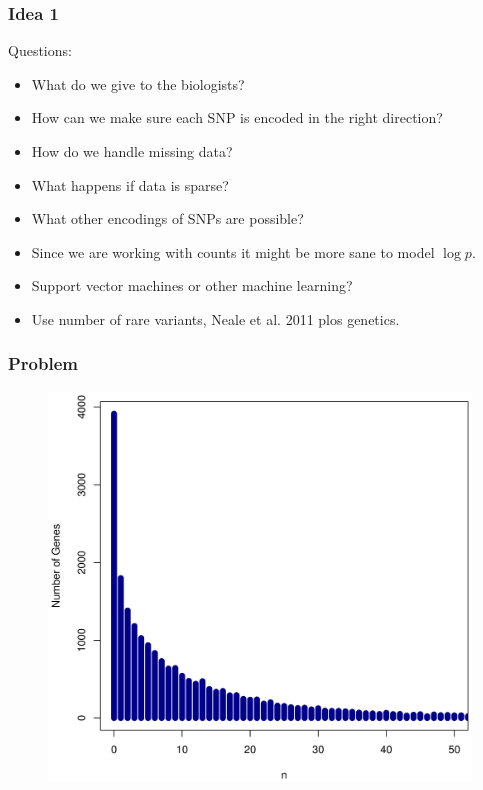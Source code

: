 \documentclass{beamer}
\begin{document}
\begin{frame}
	\frametitle{Idea 1}
	Questions:
	\begin{itemize}
		\item What do we give to the biologists?
		\item How can we make sure each SNP is encoded in the right direction?
		\item How do we handle missing data?
		\item What happens if data is sparse?
		\item What other encodings of SNPs are possible?
		\item Since we are working with counts it might be more sane to model $\log p$.
		\item Support vector machines or other machine learning?
		\item Use number of rare variants, Neale et al. 2011 plos genetics.
	\end{itemize}
\end{frame}

\begin{frame}
	\frametitle{Problem}
	\begin{figure}[htbp]
		\begin{center}
			\includegraphics{snp_hist.png}
		\end{center}
	\end{figure}

\end{frame}
\end{document}
